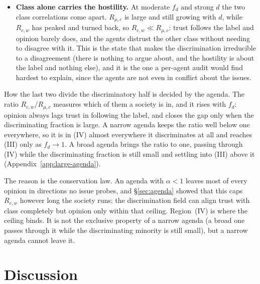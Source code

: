 \documentclass{article}
\newcommand{\Rmuc}{R_{\mu,c}}
\newcommand{\Rcw}{R_{c,w}}
\newcommand{\fd}{f_{d}}
\begin{document}
\begin{itemize}
\item[(IV)] \textbf{Class alone carries the hostility.} At moderate $\fd$ and strong
  $d$ the two class correlations come apart. $\Rmuc$ is large and still growing with
  $d$, while $\Rcw$ has peaked and turned back, so $\Rcw\ll\Rmuc$: trust follows the
  label and opinion barely does, and the agents distrust the other class without
  needing to disagree with it. This is the state that makes the discrimination
  irreducible to a disagreement (there is nothing to argue about, and
  the hostility is about the label and nothing else), and it is the one a per-agent audit would
  find hardest to explain, since the agents are not even in conflict about the issues.
\end{itemize}

How the last two divide the discriminatory half is decided by the agenda. The ratio
$\Rcw/\Rmuc$ measures which of them a society is in, and it rises with $\fd$: opinion
always lags trust in following the label, and closes the gap only when the
discriminating fraction is large. A narrow agenda keeps the ratio well below one
everywhere, so it is in (IV) almost everywhere it discriminates at all and reaches
(III) only as $\fd\to1$. A broad agenda brings the ratio to one, passing through (IV)
while the discriminating fraction is still small and settling into (III) above it
(Appendix~\ref{app:large-agenda}).

The reason is the conservation law. An agenda with $\alpha<1$ leaves most of every
opinion in directions no issue probes, and \S\ref{sec:agenda} showed that this caps
$\Rcw$ however long the society runs; the discrimination field can align trust with
class completely but opinion only within that ceiling. Region~(IV) is where the
ceiling binds. It is not the exclusive property of a narrow agenda (a broad one passes through it while the
discriminating minority is still small), but a narrow agenda cannot leave it.

\section{Discussion}
\label{sec:discussion}
\end{document}

